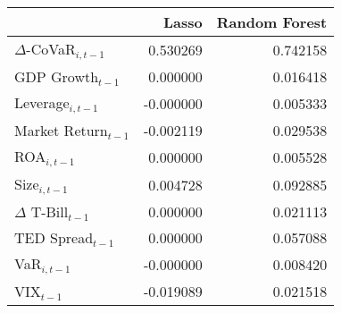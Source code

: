 \begin{tabular}{lrr}
  \hline
 & Lasso & Random Forest \\ 
  \hline
$\Delta$-CoVaR$_{i,t-1}$ & 0.530269 & 0.742158 \\ 
  GDP Growth$_{t-1}$ & 0.000000 & 0.016418 \\ 
  Leverage$_{i,t-1}$ & -0.000000 & 0.005333 \\ 
  Market Return$_{t-1}$ & -0.002119 & 0.029538 \\ 
  ROA$_{i,t-1}$ & 0.000000 & 0.005528 \\ 
  Size$_{i,t-1}$ & 0.004728 & 0.092885 \\ 
  $\Delta$ T-Bill$_{t-1}$ & 0.000000 & 0.021113 \\ 
  TED Spread$_{t-1}$ & 0.000000 & 0.057088 \\ 
  VaR$_{i,t-1}$ & -0.000000 & 0.008420 \\ 
  VIX$_{t-1}$ & -0.019089 & 0.021518 \\ 
   \hline
\end{tabular}
